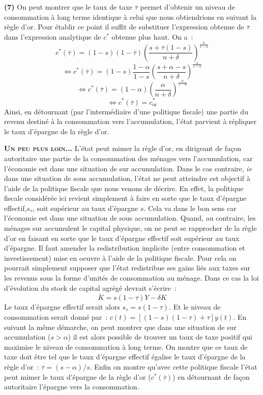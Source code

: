 \documentclass[10pt,a4paper,notitlepage,onecolumn]{article}
\newcommand{\question}[1]{\textbf{(#1)}}
\begin{document}
\question{7} On peut montrer que le taux de taxe
$\overline{\tau}$ permet d'obtenir un niveau de consommation à long
terme identique à celui que nous obtiendrions en suivant la règle
d'or. Pour établir ce point il suffit de substituer l'expression
obtenue de $\overline{\tau}$ dans l'expression analytique de
$c^{\ast}$ obtenue plus haut. On a~:
\[
c^{\ast}(\overline{\tau}) = (1-s)(1-\overline{\tau})\left(\frac{s +
\overline{\tau}(1-s)}{n+\delta}\right)^{\frac{\alpha}{1-\alpha}}
\]
\[
\Leftrightarrow c^{\ast}(\overline{\tau}) =
(1-s)\frac{1-\alpha}{1-s}\left(\frac{s +
\alpha-s}{n+\delta}\right)^{\frac{\alpha}{1-\alpha}}
\]
\[
\Leftrightarrow c^{\ast}(\overline{\tau}) =
(1-\alpha)\left(\frac{\alpha}{n+\delta}\right)^{\frac{\alpha}{1-\alpha}}
\]
\[
\Leftrightarrow c^{\ast}(\overline{\tau}) = c_{\mathrm{or}}^{\ast}
\]
Ainsi, en détournant (par l'intermédiaire d'une politique fiscale)
une partie du revenu destiné à la consommation vers l'accumulation,
l'état parvient à répliquer le taux d'épargne de la règle
d'or.\newline

\textbf{\textsc{Un peu plus loin...}} L'état peut mimer la règle d'or, en
dirigeant de façon autoritaire une partie de la consommation des
ménages vers l'accumulation, car l'économie est dans une situation
de sur accumulation. Dans le cas contraire, \textit{ie} dans une
situation de sous accumulation, l'état ne peut atteindre cet
objectif à l'aide de la politique fiscale que nous venons de
décrire. En effet, la politique fiscale considérée ici revient
simplement à faire en sorte que le taux d'épargne
effectif,$s_{\tau}$, soit supérieur au taux d'épargne $s$. Cela va
dans le bon sens car l'économie est dans une situation de sous
accumulation. Quand, au contraire, les ménages sur accumulent le
capital physique, on ne peut se rapprocher de la règle d'or en
faisant en sorte que le taux d'épargne effectif soit supérieur au
taux d'épargne. Il faut amender la redistribution implicite (entre
consommation et investissement) mise en oeuvre à l'aide de la
politique fiscale. Pour cela on pourrait simplement supposer que
l'état redistribue ses gains liés aux taxes sur les revenus sous la
forme d'unités de consommation au ménage. Dans ce cas la loi
d'évolution du stock de capital agrégé devrait s'écrire~:
\[
\dot{K} = s(1-\tau)Y - \delta K
\]
Le taux d'épargne effectif serait alors $s_{\tau}=s(1-\tau)$. Et le
niveau de consommation serait donné par~: $c(t) =
[(1-s)(1-\tau)+\tau]y(t)$. En suivant la même démarche, on peut
montrer que dans une situation de sur accumulation ($s>\alpha$) il
est alors possible de trouver un taux de taxe positif qui maximise
le niveau de consommation à long terme. On montre que ce taux de
taxe doit être tel que le taux d'épargne effectif égalise le taux
d'épargne de la règle d'or~: $\overline{\tau} = (s-\alpha)/s$. Enfin
on montre qu'avec cette politique fiscale l'état peut mimer le taux
d'épargne de la règle d'or ($c^{\ast}(\overline{\tau})$) en
détournant de façon autoritaire l'épargne vers la
consommation.\newline
\end{document}
